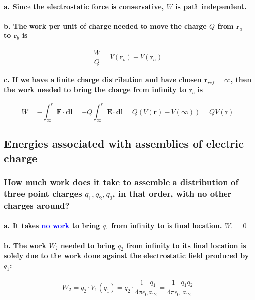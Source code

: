 \documentclass{article}
\begin{document}
\paragraph{\indent a. Since the electrostatic force is conservative, $W$ is path independent.}
\paragraph{\indent b. The work per unit of charge needed to move the charge $Q$ from $\boldsymbol{r}_a$ to $\boldsymbol{r}_b$ is }
\begin{equation*}
    \frac{W}{Q}=V(\boldsymbol{r}_b)-V(\boldsymbol{r}_a)
\end{equation*}
\paragraph{\indent c. If we have a finite charge distribution and have chosen $\boldsymbol{r}_{ref}=\infty$, then the work needed to bring the charge from infinity to $\boldsymbol{r}_a$ is }
\begin{equation*}
     W=-\int_{\infty}^{r}\boldsymbol{F\cdot dl}=-Q\int_{\infty}^{r}\boldsymbol{E\cdot dl}=Q(V(\boldsymbol{r})-V(\infty))=QV(\boldsymbol{r})
\end{equation*}
\subsection{Energies associated with assemblies of electric charge}
\subsubsection{How much work does it take to assemble a distribution of three point charges $q_1,q_2, q_3$, in that order, with no other charges around?}
\paragraph{\indent a. It takes \textcolor{blue}{no work} to bring $q_1$ from infinity to is final location. $W_1=0$}
\paragraph{\indent b. The work $W_2$ needed to bring $q_2$ from infinity to its final location is solely due to the work done against the electrostatic field produced by $q_1$:}
\begin{equation*}
    W_2=q_2\cdot V_1(q_1)=q_2\cdot\frac{1}{4\pi \epsilon_0}\frac{q_1}{\mathfrak{r}_{12}}=\frac{1}{4\pi\epsilon_0}\frac{q_1q_2}{\mathfrak{r}_{12}}
\end{equation*}
\end{document}
